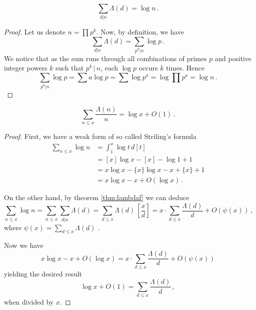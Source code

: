 \documentclass{article}
\begin{document}
\begin{theorem}
\label{thm:lambdaf}
\begin{equation*}
    \sum_{d\vert n} \Lambda(d) = \log n\,.
\end{equation*}
\begin{proof}
Let us denote $n=\prod p^k$. Now, by definition, we have
\begin{equation*}
    \sum_{d\vert n} \Lambda(d) = \sum_{p^k\vert n} \log p\,.
\end{equation*}
We notice that as the sum runs through all combinations of primes $p$ and positive integer powers $k$ such that $p^k\,\vert\, n$, each $\log p$ occurs $k$ times. Hence
\begin{equation*}
    \sum_{p^k\vert n} \log p = \sum a \log p = \sum \log p^a = \log \prod p^a = \log n\,.
\end{equation*}
\end{proof}
\end{theorem}

\begin{lemma}
\label{lemma:lambdadd}
\begin{equation*}
    \sum_{n\leq x} \frac{\Lambda(n)}{n} = \log x + O(1)\,.
\end{equation*}
\begin{proof}
First, we have a weak form of so called Striling's formula \cite{Goldmakher}
\begin{align*}
    \sum_{n\leq x} \log n & = \int_1^x \log t\,d[t]\\
    & = [x]\log x - [x] - \log 1 + 1\\
    & = x\log x - \{x\}\log x - x + \{x\} + 1\\
    & = x\log x - x + O(\log x)\,.
\end{align*}

On the other hand, by theorem \ref{thm:lambdaf} we can deduce
\begin{equation*}
    \sum_{n\leq x} \log n = \sum_{n\leq x} \sum_{d\vert n} \Lambda(d) = \sum_{d\leq x} \Lambda(d)\,\left[\frac{x}{d}\right] = x\cdot\sum_{d\leq x} \frac{\Lambda(d)}{d} + O(\psi(x))\,,
\end{equation*}
where $\psi(x)=\sum_{d\leq x} \Lambda(d)$ \cite{Goldmakher}.

Now we have
\begin{equation*}
    x\log x - x + O(\log x) = x\cdot\sum_{d\leq x} \frac{\Lambda(d)}{d} + O(\psi(x))
\end{equation*}
yielding \cite{Goldmakher} the desired result
\begin{equation*}
    \log x + O(1) = \sum_{d\leq x} \frac{\Lambda(d)}{d}\,,
\end{equation*}
when divided by $x$.
\end{proof}
\end{lemma}
\end{document}
